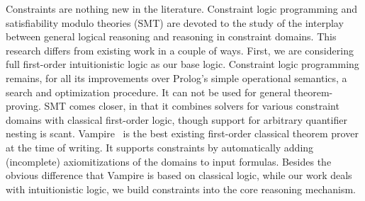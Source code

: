 Constraints are nothing new in the literature.  Constraint logic programming and
satisfiability modulo theories (SMT) are devoted to the study of the interplay
between general logical reasoning and reasoning in constraint domains.  This
research differs from existing work in a couple of ways.  First, we are
considering full first-order intuitionistic logic as our base logic.  Constraint
logic programming remains, for all its improvements over Prolog's simple
operational semantics, a search and optimization procedure.  It can not be used
for general theorem-proving.  SMT comes closer, in that it combines solvers for
various constraint domains with classical first-order logic, though support for
arbitrary quantifier nesting is scant.  Vampire~\cite{Riazanov.1999.CADE} is the
best existing first-order classical theorem prover at the time of writing.  It
supports constraints by automatically adding (incomplete) axiomitizations of the
domains to input formulas.  Besides the obvious difference that Vampire is based
on classical logic, while our work deals with intuitionistic logic, we build
constraints into the core reasoning mechanism.


